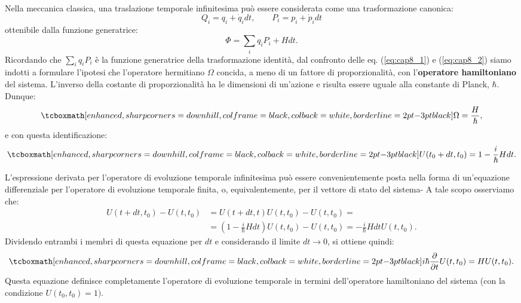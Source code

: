 \documentclass[a4paper,12pt,oneside]{book}
\begin{document}
Nella meccanica classica, una traslazione temporale infinitesima può essere considerata come una trasformazione canonica:
\begin{equation}
Q_i = q_i+\dot{q}_idt, \qquad P_i = p_i+\dot{p}_idt
\end{equation}
ottenibile dalla funzione generatrice:
\begin{equation}
\Phi = \sum _i q_iP_i+ Hdt.
\label{eq:cap8_2}
\end{equation}
Ricordando che $\sum _i q_iP_i$ è la funzione generatrice della trasformazione identità, dal confronto delle eq. (\ref{eq:cap8_1}) e (\ref{eq:cap8_2}) siamo indotti a formulare l'ipotesi che l'operatore hermitiano $\Omega$ concida, a meno di un fattore di proporzionalità, con l'\textbf{operatore hamiltoniano} del sistema. L'inverso della costante di proporzionalità ha le dimensioni di un'azione e risulta essere uguale alla constante di Planck, $\hbar$. Dunque:
	\begin{equation}
		\tcboxmath[enhanced, sharp corners=downhill, colframe=black, colback=white, borderline={2pt}{-3pt}{black}]{
		\Omega = \frac{H}{\hbar},
		}
	\end{equation}
e con questa identificazione:
	\begin{equation}
		\tcboxmath[enhanced, sharp corners=downhill, colframe=black, colback=white, borderline={2pt}{-3pt}{black}]{
			U(t_0+dt,t_0) =1-\frac{i}{\hbar}Hdt.
			}
	\end{equation}
	
L'espressione derivata per l'operatore di evoluzione temporale infinitesima può essere convenientemente posta nella forma di un'equazione differenziale per l'operatore di evoluzione temporale finita, o, equivalentemente, per il vettore di stato del sistema- A tale scopo osserviamo che:
	\begin{align}
		U(t+dt,t_0)-U(t,t_0)&=  U(t+dt,t)U(t,t_0)-U(t,t_0)= \nonumber\\
		& =\left(1-\frac{i}{\hbar}Hdt \right)U(t,t_0)-U(t,t_0)=-\frac{i}{\hbar}Hdt U(t,t_0).
	\end{align}
Dividendo entrambi i membri di questa equazione per $dt$ e considerando il limite $dt \longrightarrow 0$, si ottiene quindi:
	\begin{equation}
		\tcboxmath[enhanced, sharp corners=downhill, colframe=black, colback=white, borderline={2pt}{-3pt}{black}]{
			i\hbar \frac{\partial}{\partial t} U (t, t_0)= H U(t,t_0).
			}
	\label{eq:cap8_3}
	\end{equation}
Questa equazione definisce completamente l'operatore di evoluzione temporale in termini dell'operatore hamiltoniano del sistema (con la condizione $U(t_0,t_0)=1).$\\
\end{document}
